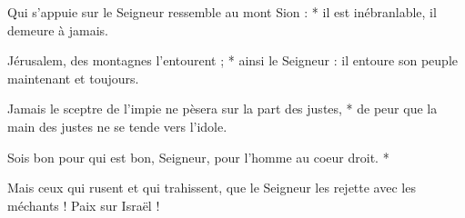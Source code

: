 \item Qui s'appuie sur le Seigneur ressemble au mont Sion : * il est inébranlable, il demeure à jamais.

\item Jérusalem, des montagnes l'entourent ; * ainsi le Seigneur : il entoure son peuple maintenant et toujours.

\item Jamais le sceptre de l'impie ne pèsera sur la part des justes, * de peur que la main des justes ne se tende vers l'idole.

\item Sois bon pour qui est bon, Seigneur, pour l'homme au coeur droit. *

\item Mais ceux qui rusent et qui trahissent, que le Seigneur les rejette avec les méchants ! Paix sur Israël !
